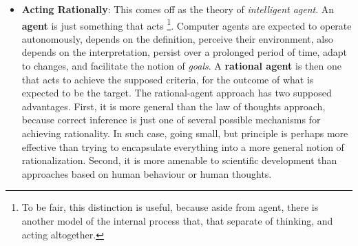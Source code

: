 \begin{itemize}
        \item \textbf{Acting Rationally}: This comes off as the theory of \textit{intelligent agent}. An \textbf{agent} is just something that acts \footnote{To be fair, this distinction is useful, because aside from agent, there is another model of the internal process that, that separate of thinking, and acting altogether.}. Computer agents are expected to operate autonomously, depends on the definition, perceive their environment, also depends on the interpretation, persist over a prolonged period of time, adapt to changes, and facilitate the notion of \textit{goals}. A \textbf{rational agent} is then one that acts to achieve the supposed criteria, for the outcome of what is expected to be the target. The rational-agent approach has two supposed advantages. First, it is more general than the law of thoughts approach, because correct inference is just one of several possible mechanisms for achieving rationality. In such case, going small, but principle is perhaps more effective than trying to encapsulate everything into a more general notion of rationalization. Second, it is more amenable to scientific development than approaches based on human behaviour or human thoughts. 
    \end{itemize}

